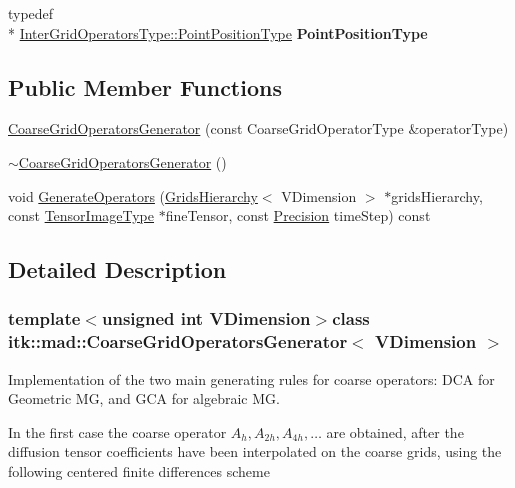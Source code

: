 \begin{DoxyCompactItemize}
\item 
\hypertarget{classitk_1_1mad_1_1_coarse_grid_operators_generator_a7cd1d902fe4381841b7d4b007beb31c9}{typedef \\*
\hyperlink{classitk_1_1mad_1_1_inter_grid_operators_a7dfcf280f70ae36e4860d8d962f4a05d}{Inter\-Grid\-Operators\-Type\-::\-Point\-Position\-Type} {\bfseries Point\-Position\-Type}}\label{classitk_1_1mad_1_1_coarse_grid_operators_generator_a7cd1d902fe4381841b7d4b007beb31c9}

\end{DoxyCompactItemize}
\subsection*{Public Member Functions}
\begin{DoxyCompactItemize}
\item 
\hyperlink{classitk_1_1mad_1_1_coarse_grid_operators_generator_a391e021a367f2b50d0b0c9dbb2976f45}{Coarse\-Grid\-Operators\-Generator} (const Coarse\-Grid\-Operator\-Type \&operator\-Type)
\item 
\hyperlink{classitk_1_1mad_1_1_coarse_grid_operators_generator_aa502fa1ba4b27424fca4e0ad38b8dda2}{$\sim$\-Coarse\-Grid\-Operators\-Generator} ()
\item 
void \hyperlink{classitk_1_1mad_1_1_coarse_grid_operators_generator_ab4819801d640b41202eab1617a001a74}{Generate\-Operators} (\hyperlink{classitk_1_1mad_1_1_grids_hierarchy}{Grids\-Hierarchy}$<$ V\-Dimension $>$ $\ast$grids\-Hierarchy, const \hyperlink{class_image}{Tensor\-Image\-Type} $\ast$fine\-Tensor, const \hyperlink{classitk_1_1mad_1_1_coarse_grid_operators_generator_a271e011defd362bc027e771f8efdd693}{Precision} time\-Step) const 
\end{DoxyCompactItemize}


\subsection{Detailed Description}
\subsubsection*{template$<$unsigned int V\-Dimension$>$class itk\-::mad\-::\-Coarse\-Grid\-Operators\-Generator$<$ V\-Dimension $>$}

Implementation of the two main generating rules for coarse operators\-: D\-C\-A for Geometric M\-G, and G\-C\-A for algebraic M\-G. 

In the first case the coarse operator $ A_h, A_{2h}, A_{4h}, \dots $ are obtained, after the diffusion tensor coefficients have been interpolated on the coarse grids, using the following centered finite differences scheme

